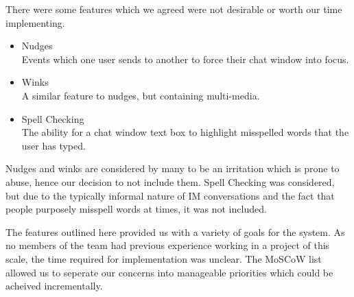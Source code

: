 There were some features which we agreed were not desirable or worth our time implementing.

\begin{itemize}

\item{Nudges\\
	Events which one user sends to another to force their chat window into focus.}
\item{Winks\\
	A similar feature to nudges, but containing multi-media.}
\item{Spell Checking\\
	The ability for a chat window text box to highlight misspelled words that the user has typed.}

\end{itemize}

Nudges and winks are considered by many to be an irritation which is prone to abuse, hence our decision to not include them. Spell Checking was considered, but due to the typically informal nature of IM conversations and the fact that people purposely misspell words at times, it was not included.

The features outlined here provided us with a variety of goals for the system. As no members of the team had previous experience working in a project of this scale, the time required for implementation was unclear. The MoSCoW list allowed us to seperate our concerns into manageable priorities which could be acheived incrementally.
